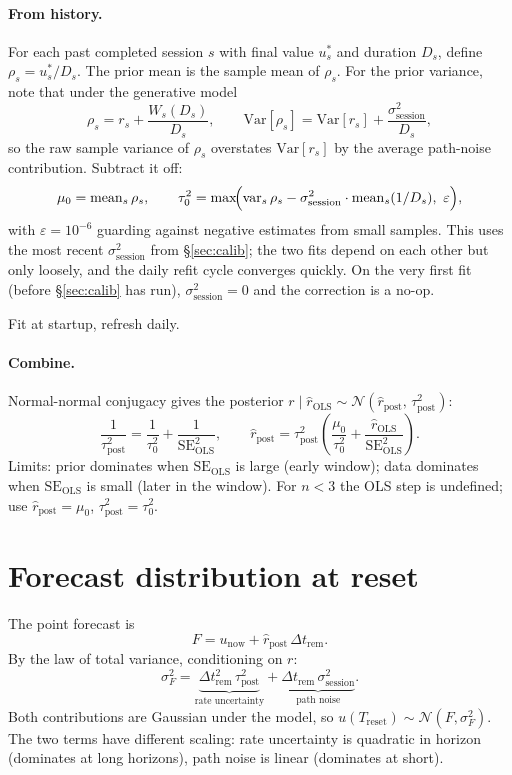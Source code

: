 \documentclass[11pt]{article}
\newcommand{\rpost}{\hat r_{\text{post}}}
\newcommand{\taupostsq}{\tau_{\text{post}}^2}
\newcommand{\tauzerosq}{\tau_0^2}
\newcommand{\rols}{\hat r_{\text{OLS}}}
\newcommand{\seols}{\mathrm{SE}_{\text{OLS}}}
\newcommand{\seolssq}{\mathrm{SE}_{\text{OLS}}^2}
\newcommand{\sigsessionsq}{\sigma_{\text{session}}^2}
\newcommand{\unow}{u_{\text{now}}}
\newcommand{\Treset}{T_{\text{reset}}}
\newcommand{\Dtrem}{\Delta t_{\text{rem}}}
\begin{document}
\paragraph{From history.} For each past completed session $s$ with final
value $u_s^\ast$ and duration $D_s$, define $\rho_s = u_s^\ast / D_s$. The
prior mean is the sample mean of $\rho_s$. For the prior variance, note that
under the generative model
\[
  \rho_s = r_s + \frac{W_s(D_s)}{D_s},
  \qquad \mathrm{Var}[\rho_s] = \mathrm{Var}[r_s] + \frac{\sigsessionsq}{D_s},
\]
so the raw sample variance of $\rho_s$ overstates $\mathrm{Var}[r_s]$ by the
average path-noise contribution. Subtract it off:
\[
  \mu_0 = \mathrm{mean}_s\,\rho_s,
  \qquad
  \tauzerosq = \max\!\Bigl(\mathrm{var}_s\,\rho_s
    - \sigsessionsq \cdot \mathrm{mean}_s(1/D_s),\ \varepsilon\Bigr),
\]
with $\varepsilon = 10^{-6}$ guarding against negative estimates from small
samples. This uses the most recent $\sigsessionsq$ from \S\ref{sec:calib};
the two fits depend on each other but only loosely, and the daily refit
cycle converges quickly. On the very first fit (before \S\ref{sec:calib} has
run), $\sigsessionsq = 0$ and the correction is a no-op.

Fit at startup, refresh daily.

\paragraph{Combine.} Normal-normal conjugacy gives the posterior $r \mid
\rols \sim \mathcal{N}(\rpost,\, \taupostsq)$:
\[
  \frac{1}{\taupostsq} = \frac{1}{\tauzerosq} + \frac{1}{\seolssq},
  \qquad
  \rpost = \taupostsq
    \left(\frac{\mu_0}{\tauzerosq} + \frac{\rols}{\seolssq}\right).
\]
Limits: prior dominates when $\seols$ is large (early window); data
dominates when $\seols$ is small (later in the window). For $n < 3$ the OLS
step is undefined; use $\rpost = \mu_0$, $\taupostsq = \tauzerosq$.

\section{Forecast distribution at reset}

The point forecast is
\[
  F = \unow + \rpost\,\Dtrem.
\]
By the law of total variance, conditioning on $r$:
\[
  \sigma_F^2 = \underbrace{\Dtrem^2\,\taupostsq}_{\text{rate uncertainty}}
            + \underbrace{\Dtrem\,\sigsessionsq}_{\text{path noise}}.
\]
Both contributions are Gaussian under the model, so $u(\Treset) \sim
\mathcal{N}(F, \sigma_F^2)$. The two terms have different scaling: rate
uncertainty is quadratic in horizon (dominates at long horizons), path noise
is linear (dominates at short).
\end{document}
